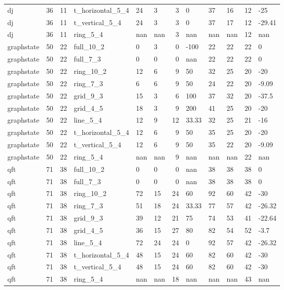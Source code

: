 \begin{longtable}{lrrlllrlllrl}
dj & 36 & 11 & t\_horizontal\_5\_4 & 24 & 3 & 3 & 0 & 37 & 16 & 12 & -25 \\
dj & 36 & 11 & t\_vertical\_5\_4 & 24 & 3 & 3 & 0 & 37 & 17 & 12 & -29.41 \\
dj & 36 & 11 & ring\_5\_4 & nan & nan & 3 & nan & nan & nan & 12 & nan \\
graphstate & 50 & 22 & full\_10\_2 & 0 & 3 & 0 & -100 & 22 & 22 & 22 & 0 \\
graphstate & 50 & 22 & full\_7\_3 & 0 & 0 & 0 & nan & 22 & 22 & 22 & 0 \\
graphstate & 50 & 22 & ring\_10\_2 & 12 & 6 & 9 & 50 & 32 & 25 & 20 & -20 \\
graphstate & 50 & 22 & ring\_7\_3 & 6 & 6 & 9 & 50 & 24 & 22 & 20 & -9.09 \\
graphstate & 50 & 22 & grid\_9\_3 & 15 & 3 & 6 & 100 & 37 & 32 & 20 & -37.5 \\
graphstate & 50 & 22 & grid\_4\_5 & 18 & 3 & 9 & 200 & 41 & 25 & 20 & -20 \\
graphstate & 50 & 22 & line\_5\_4 & 12 & 9 & 12 & 33.33 & 32 & 25 & 21 & -16 \\
graphstate & 50 & 22 & t\_horizontal\_5\_4 & 12 & 6 & 9 & 50 & 35 & 25 & 20 & -20 \\
graphstate & 50 & 22 & t\_vertical\_5\_4 & 12 & 6 & 9 & 50 & 35 & 22 & 20 & -9.09 \\
graphstate & 50 & 22 & ring\_5\_4 & nan & nan & 9 & nan & nan & nan & 22 & nan \\
qft & 71 & 38 & full\_10\_2 & 0 & 0 & 0 & nan & 38 & 38 & 38 & 0 \\
qft & 71 & 38 & full\_7\_3 & 0 & 0 & 0 & nan & 38 & 38 & 38 & 0 \\
qft & 71 & 38 & ring\_10\_2 & 72 & 15 & 24 & 60 & 92 & 60 & 42 & -30 \\
qft & 71 & 38 & ring\_7\_3 & 51 & 18 & 24 & 33.33 & 77 & 57 & 42 & -26.32 \\
qft & 71 & 38 & grid\_9\_3 & 39 & 12 & 21 & 75 & 74 & 53 & 41 & -22.64 \\
qft & 71 & 38 & grid\_4\_5 & 36 & 15 & 27 & 80 & 82 & 54 & 52 & -3.7 \\
qft & 71 & 38 & line\_5\_4 & 72 & 24 & 24 & 0 & 92 & 57 & 42 & -26.32 \\
qft & 71 & 38 & t\_horizontal\_5\_4 & 48 & 15 & 24 & 60 & 82 & 60 & 42 & -30 \\
qft & 71 & 38 & t\_vertical\_5\_4 & 48 & 15 & 24 & 60 & 82 & 60 & 42 & -30 \\
qft & 71 & 38 & ring\_5\_4 & nan & nan & 18 & nan & nan & nan & 43 & nan \\

\end{longtable}
